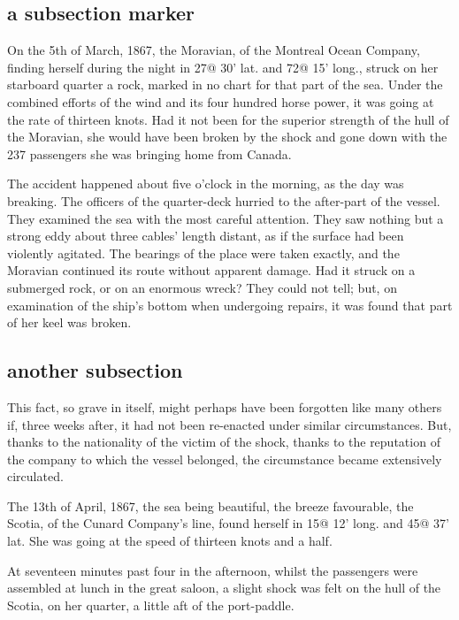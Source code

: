 \subsection{a subsection marker}

On the 5th of March, 1867, the Moravian, of the Montreal Ocean Company,
finding herself during the night in 27@ 30' lat.  and 72@ 15' long., struck
on her starboard quarter a rock, marked in no chart for that part of the sea.
Under the combined efforts of the wind and its four hundred horse power,
it was going at the rate of thirteen knots.  Had it not been for the superior
strength of the hull of the Moravian, she would have been broken by the shock
and gone down with the 237 passengers she was bringing home from Canada.

The accident happened about five o'clock in the morning, as the day
was breaking.  The officers of the quarter-deck hurried to the after-part
of the vessel.  They examined the sea with the most careful attention.
They saw nothing but a strong eddy about three cables' length distant,
as if the surface had been violently agitated.  The bearings of the place were
taken exactly, and the Moravian continued its route without apparent damage.
Had it struck on a submerged rock, or on an enormous wreck?  They could
not tell; but, on examination of the ship's bottom when undergoing repairs,
it was found that part of her keel was broken.

\subsection{another subsection}

This fact, so grave in itself, might perhaps have been forgotten
like many others if, three weeks after, it had not been re-enacted
under similar circumstances.  But, thanks to the nationality of
the victim of the shock, thanks to the reputation of the company to
which the vessel belonged, the circumstance became extensively circulated.

The 13th of April, 1867, the sea being beautiful, the breeze favourable,
the Scotia, of the Cunard Company's line, found herself in 15@ 12' long.
and 45@ 37' lat.  She was going at the speed of thirteen knots and a half.

At seventeen minutes past four in the afternoon, whilst the passengers were
assembled at lunch in the great saloon, a slight shock was felt on the hull
of the Scotia, on her quarter, a little aft of the port-paddle.

